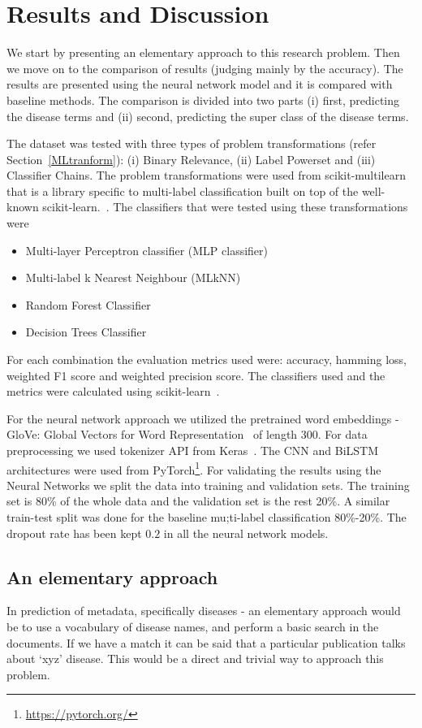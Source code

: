 \chapter{Results and Discussion}\label{chap: results}

We start by presenting an elementary approach to this research problem. Then we move on to the comparison of results (judging mainly by the accuracy). The results are presented using the neural network model and it is compared with baseline methods. The comparison is divided into two parts (i) first, predicting the disease terms and (ii) second, predicting the super class of the disease terms.

The dataset was tested with three types of problem transformations (refer Section~\ref{MLtranform}): (i) Binary Relevance, (ii) Label Powerset and (iii) Classifier Chains. The problem transformations were used from scikit-multilearn that is a library specific to multi-label classification built on top of the well-known scikit-learn.~\cite{2017arXiv171100046S}. The classifiers that were tested using these transformations were 
\begin{itemize}
    \item Multi-layer Perceptron classifier (MLP classifier) 
    \item Multi-label k Nearest Neighbour (MLkNN) 
    \item Random Forest Classifier 
    \item Decision Trees Classifier 
\end{itemize}
For each combination the evaluation metrics used were: accuracy, hamming loss, weighted F1 score and weighted precision score. The classifiers used and the metrics were calculated using scikit-learn~\cite{scikit-learn}. 

For the neural network approach we utilized the pretrained word embeddings - GloVe: Global Vectors for Word Representation~\cite{pennington2014glove} of length 300. For data preprocessing we used tokenizer API from Keras~\cite{chollet2015keras}. The CNN and BiLSTM architectures were used from PyTorch\footnote{\url{https://pytorch.org/}}.
For validating the results using the Neural Networks we split the data into training and validation sets. The training set is 80\% of the whole data and the validation set is the rest 20\%. A similar train-test split was done for the baseline mu;ti-label classification 80\%-20\%. The dropout rate has been kept $0.2$ in all the neural network models. 

\section{An elementary approach}
In prediction of metadata, specifically diseases - an elementary approach would be to use a vocabulary of disease names, and perform a basic search in the documents. If we have a match it can be said that a particular publication talks about `xyz' disease. This would be a direct and trivial way to approach this problem. 

